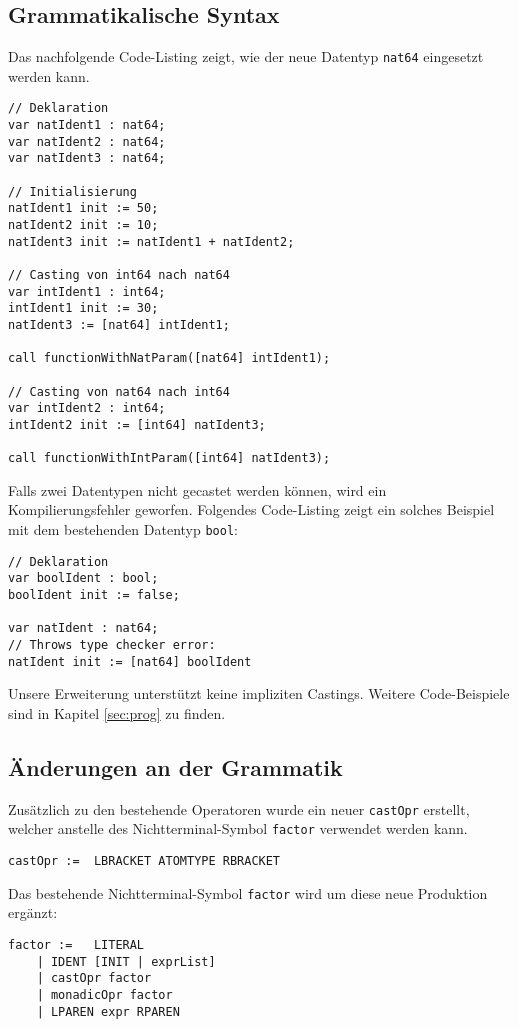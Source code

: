 \documentclass[10pt, a4paper, twocolumn]{article} %
\begin{document}
\subsection{Grammatikalische Syntax}
Das nachfolgende Code-Listing zeigt, wie der neue Datentyp \texttt{nat64} eingesetzt werden kann.
\begin{lstlisting}
// Deklaration
var natIdent1 : nat64;
var natIdent2 : nat64;
var natIdent3 : nat64;

// Initialisierung
natIdent1 init := 50;
natIdent2 init := 10;
natIdent3 init := natIdent1 + natIdent2;

// Casting von int64 nach nat64
var intIdent1 : int64;
intIdent1 init := 30;
natIdent3 := [nat64] intIdent1;

call functionWithNatParam([nat64] intIdent1);

// Casting von nat64 nach int64
var intIdent2 : int64;
intIdent2 init := [int64] natIdent3;

call functionWithIntParam([int64] natIdent3);
\end{lstlisting}
Falls zwei Datentypen nicht gecastet werden können, wird ein Kompilierungsfehler geworfen.
Folgendes Code-Listing zeigt ein solches Beispiel mit dem bestehenden Datentyp \texttt{bool}:
\begin{lstlisting}
// Deklaration
var boolIdent : bool;
boolIdent init := false;

var natIdent : nat64;
// Throws type checker error:
natIdent init := [nat64] boolIdent
\end{lstlisting}
Unsere Erweiterung unterstützt keine impliziten Castings.
Weitere Code-Beispiele sind in Kapitel \ref{sec:prog} zu finden.

\subsection{Änderungen an der Grammatik}

Zusätzlich zu den bestehende Operatoren wurde ein neuer \texttt{castOpr} erstellt, welcher anstelle des Nichtterminal-Symbol \texttt{factor} verwendet werden kann.
\begin{lstlisting}[backgroundcolor = \color{lightgray},
xleftmargin = 0.05cm,
framexleftmargin = 0.05em]
    castOpr :=  LBRACKET ATOMTYPE RBRACKET
\end{lstlisting}
Das bestehende Nichtterminal-Symbol \texttt{factor} wird um diese neue Produktion ergänzt:
\begin{lstlisting}[backgroundcolor = \color{lightgray},
xleftmargin = 0.05cm,
framexleftmargin = 0.05em]
    factor :=   LITERAL
    | IDENT [INIT | exprList]
    | castOpr factor
    | monadicOpr factor
    | LPAREN expr RPAREN
\end{lstlisting}
\end{document}
